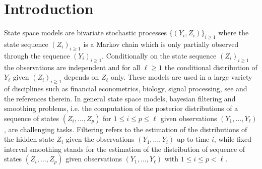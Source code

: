 \documentclass[nolayout]{article}
\theoremstyle{plain}
\theoremstyle{definition}
\newcommand{\1}{\mathbbm{1}}
\begin{document}
\section{Introduction} \label{sec:intro}
State space models are bivariate stochastic processes $\{(Y_i,Z_i)\}_{i\ge 1}$ where the state sequence $(Z_i)_{i\ge 1}$ is a Markov chain which is only partially observed through the sequence $(Y_i)_{i\ge 1}$. Conditionally on the state sequence $(Z_i)_{i\ge 1}$ the observations are independent and for all $\ell\ge 1$ the conditional distribution of $Y_{\ell}$ given $(Z_i)_{i\ge 1}$ depends on $Z_{\ell}$ only. These models are used in a large variety of disciplines such as financial econometrics, biology, signal processing, see \cite{delmoral:2013} and the references therein. In general state space models, bayesian filtering and smoothing problems, i.e. the computation of the posterior distributions of a sequence of states $(Z_{i},\ldots,Z_{p})$ for $1\le i\le p\le \ell$ given observations $(Y_{1},\ldots,Y_{\ell})$, are challenging tasks. Filtering refers to the estimation of the distributions of the hidden state $Z_i$ given the observations $(Y_1,\ldots,Y_i)$ up to time $i$, while fixed-interval smoothing stands for the estimation of the distribution of sequence of states $(Z_{i},\ldots,Z_{p})$ given observations $(Y_{1},\ldots,Y_{\ell})$ with $1\le i\le p<\ell$. 
 
\end{document}

